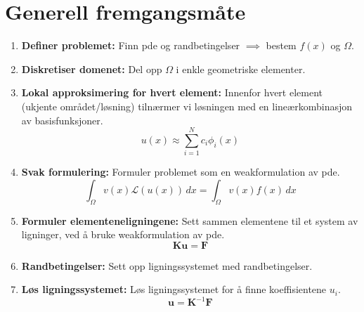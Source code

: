 \section{Generell fremgangsmåte}

\begin{enumerate}
  \item \textbf{Definer problemet:} Finn \gls{pde} og randbetingelser \(\implies\) bestem \(f(x)\) og \(\Omega\).
  \item \textbf{Diskretiser domenet:} Del opp \(\Omega\) i enkle geometriske elementer.
  \item \textbf{Lokal approksimering for hvert element:} Innenfor hvert element (ukjente området/løsning) tilnærmer vi løsningen med en lineærkombinasjon av basisfunksjoner.
        \[
          u(x) \approx \sum_{i=1}^N c_i \phi_i(x)
        \]
  \item \textbf{Svak formulering:} Formuler problemet som en \gls{weakformulation} av \gls{pde}.
        \[
          \int_\Omega v(x) \mathcal{L}(u(x)) \, dx = \int_\Omega v(x) f(x) \, dx
        \]
  \item \textbf{Formuler elementeneligningene:} Sett sammen elementene til et system av ligninger, ved å bruke \gls{weakformulation} av \gls{pde}.
        \[
          \symbf{K} \symbf{u} = \symbf{F}
        \]
  \item \textbf{Randbetingelser:} Sett opp ligningssystemet med randbetingelser.
  \item \textbf{Løs ligningssystemet:} Løs ligningssystemet for å finne koeffisientene \(u_i\).
        \[
          \symbf{u} = \symbf{K}^{-1} \symbf{F}
        \]
\end{enumerate}

